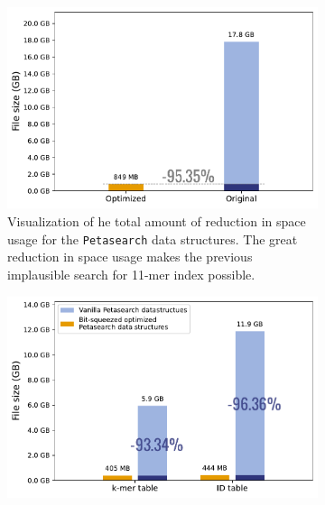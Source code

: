 \pagebreak
\begin{figpage}
  \captionsetup[figure]{width=.9\linewidth}
  \captionsetup[subfigure]{
    width=.9\linewidth
  }
  \centering
  \begin{figure}
    \begin{subfigure}{0.5\textwidth}
      \centering
      \includegraphics[width=\textwidth]{images/bitsqueeze_alternative.pdf}
      \centering
      \caption{Visualization of he total amount of reduction in space usage for the \texttt{Petasearch} data structures.
        The great reduction in space usage makes the previous implausible search for 11-mer index possible.}
      \label{fig:total_effect_of_bitsqueeze}
    \end{subfigure}
    \begin{subfigure}{0.5\textwidth}
      \centering
      \includegraphics[width=\textwidth]{images/bitsqueeze_optimization.pdf}

\end{subfigure}
\end{figure}
\end{figpage}
